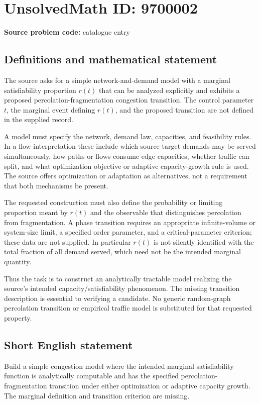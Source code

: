 \documentclass[11pt]{article}
\begin{document}
\section*{UnsolvedMath ID: 9700002}
\textbf{Source problem code:} catalogue entry
\subsection{Definitions and mathematical statement}
The source asks for a simple network-and-demand model with a marginal satisfiability proportion $r(t)$ that can be analyzed explicitly and exhibits a proposed percolation-fragmentation congestion transition. The control parameter $t$, the marginal event defining $r(t)$, and the proposed transition are not defined in the supplied record.

A model must specify the network, demand law, capacities, and feasibility rules. In a flow interpretation these include which source-target demands may be served simultaneously, how paths or flows consume edge capacities, whether traffic can split, and what optimization objective or adaptive capacity-growth rule is used. The source offers optimization or adaptation as alternatives, not a requirement that both mechanisms be present.

The requested construction must also define the probability or limiting proportion meant by $r(t)$ and the observable that distinguishes percolation from fragmentation. A phase transition requires an appropriate infinite-volume or system-size limit, a specified order parameter, and a critical-parameter criterion; these data are not supplied. In particular $r(t)$ is not silently identified with the total fraction of all demand served, which need not be the intended marginal quantity.

Thus the task is to construct an analytically tractable model realizing the source's intended capacity/satisfiability phenomenon. The missing transition description is essential to verifying a candidate. No generic random-graph percolation transition or empirical traffic model is substituted for that requested property.
\subsection{Short English statement}
Build a simple congestion model where the intended marginal satisfiability function is analytically computable and has the specified percolation-fragmentation transition under either optimization or adaptive capacity growth. The marginal definition and transition criterion are missing.
\end{document}
